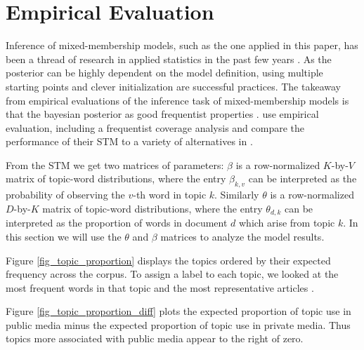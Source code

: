 \documentclass[12pt,a4paper,notitlepage]{article}
\begin{document}
\section{Empirical Evaluation}


Inference of mixed-membership models, such as the one applied in this paper, has been a thread of research in applied statistics in the past few years \citep{blei_latent_2003} \citep{erosheva_mixed-membership_2004} \citep{braun_variational_2010}. As the posterior can be highly dependent on the model definition, using multiple starting points and clever initialization are successful practices. The takeaway from empirical evaluations of the inference task of mixed-membership models is that the bayesian posterior as good frequentist properties \citep{wallach_evaluation_2009}. \citet{roberts_model_2016} use empirical evaluation, including a frequentist coverage analysis and compare the performance of their STM to a variety of alternatives in \citet{roberts_navigating_2016}. 

From the STM we get two matrices of parameters: $\beta$ is a row-normalized $K$-by-$V$ matrix of topic-word distributions, where the entry $\beta_{k,v}$ can be interpreted as the probability of observing the $v$-th word in topic $k$. Similarly $\theta$ is a row-normalized $D$-by-$K$ matrix of topic-word distributions, where the entry $\theta_{d,k}$ can be interpreted as the proportion of words in document $d$ which arise from topic $k$. In this section we will use the $\theta$ and $\beta$ matrices to analyze the model results.  

Figure \ref{fig_topic_proportion} displays the topics ordered by their expected frequency across the corpus. To assign a label to each topic, we looked at the most frequent words in that topic and the most representative articles \citep{roberts_model_2016}.  

Figure \ref{fig_topic_proportion_diff} plots the expected proportion of topic use in public media minus the expected proportion of topic use in private media. Thus topics more associated with public media appear to the right of zero.
\end{document}
